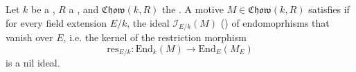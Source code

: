 \begin{definition} \label{definition:rost_nilpotence_for_a_chow_motive_over_a_field_with_coefficients_in_a_commutative_ring}
Let $k$ be a , $R$ a , and $\mathfrak{Chow}(k, R)$ the . 
A motive $M \in \mathfrak{Chow}(k, R)$ satisfies  if for every field extension $E/k$, the ideal $\mathcal{I}_{E/k}(M)$ () of endomoprhisms that vanish over $E$, i.e. the kernel of the restriction morphism 
$$\mathrm{res}_{E/k}: \mathrm{End}_k(M) \to \mathrm{End}_E(M_E)$$ 
is a nil ideal.
\end{definition}